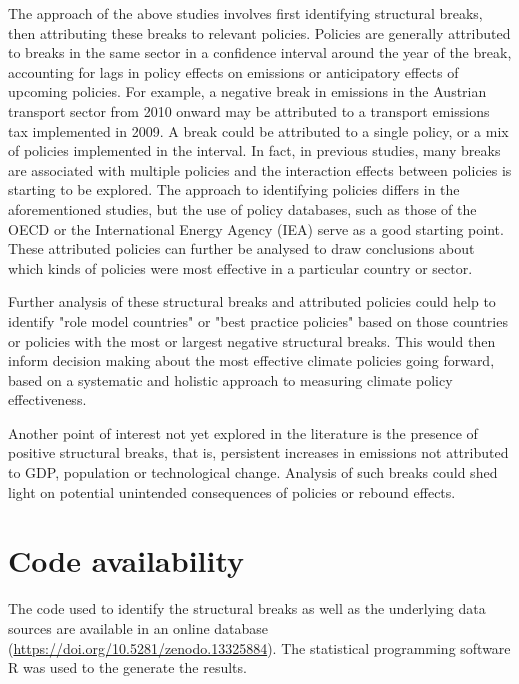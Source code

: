 \documentclass[a4paper]{article}
\begin{document}
The approach of the above studies involves first identifying structural breaks, then attributing these breaks to relevant policies. Policies are generally attributed to breaks in the same sector in a confidence interval around the year of the break, accounting for lags in policy effects on emissions or anticipatory effects of upcoming policies. For example, a negative break in emissions in the Austrian transport sector from 2010 onward may be attributed to a transport emissions tax implemented in 2009. A break could be attributed to a single policy, or a mix of policies implemented in the interval. In fact, in previous studies, many breaks are associated with multiple policies and the interaction effects between policies is starting to be explored. The approach to identifying policies differs in the aforementioned studies, but the use of policy databases, such as those of the OECD or the International Energy Agency (IEA) serve as a good starting point. These attributed policies can further be analysed to draw conclusions about which kinds of policies were most effective in a particular country or sector.

Further analysis of these structural breaks and attributed policies could help to identify "role model countries" or "best practice policies" based on those countries or policies with the most or largest negative structural breaks. This would then inform decision making about the most effective climate policies going forward, based on a systematic and holistic approach to measuring climate policy effectiveness.

Another point of interest not yet explored in the literature is the presence of positive structural breaks, that is, persistent increases in emissions not attributed to GDP, population or technological change. Analysis of such breaks could shed light on potential unintended consequences of policies or rebound effects.


\section*{Code availability}

The code used to identify the structural breaks as well as the underlying data sources are available in an online database (\url{https://doi.org/10.5281/zenodo.13325884}). \cite{breaks_database} The statistical programming software R was used to the generate the results.
\end{document}
